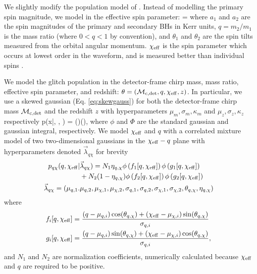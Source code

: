 \begin{refsection}
We slightly modify the population model of \cite{2022CQGra..39q5004A}. Instead of modelling the primary spin magnitude, we model in the effective spin parameter:
\beq
\chieff = 
\label{eq:chieff}
\eeq
where $a_1$ and $a_2$ are the spin magnitudes of the primary and secondary BHs in Kerr units, $q = m_2/m_1$ is the mass ratio (where $0<q<1$ by convention), and $\theta_1$ and $\theta_2$ are the spin tilts measured from the orbital angular momentum. $\chi_{\rm eff}$ is the spin parameter which occurs at lowest order in the waveform, and is measured better than individual spins \citep{2008PhRvD..78d4021R,2016PhRvD..93h4042P,2017PhRvD..95f4053V, 2018PhRvD..98h3007N}. 

We model the glitch population in the detector-frame chirp mass, mass ratio, effective spin parameter, and redshift: $\theta = (\mathcal{M}_{\rm c,det}, q, \chi_{\rm eff}, z)$. In particular, we use a skewed gaussian (Eq. \ref{eq:skewgauss}) for both the detector-frame chirp mass $\mathcal{M}_{\rm c,det}$ and the redshift $z$ with hyperparameters $\mu_m, \sigma_m, \kappa_m$ and $\mu_z, \sigma_z, \kappa_z$ respectively
\beq
p(x|\mu, \sigma, \kappa) = \phi\left(\right)\Phi\left(\kappa{}\right),
\label{eq:skewgauss}
\eeq
where $\phi$ and $\Phi$ are the standard gaussian and gaussian integral, respectively.
We model $\chi_{\rm eff}$ and $q$ with a correlated mixture model of two two-dimensional gaussians in the $\chi_{\rm eff}-q$ plane with hyperparameters denoted $\vec{\lambda}_{q\chi}$ for brevity
\begin{align}
p_{q\chi}(q,\chi_{\rm eff} | &\vec{\lambda}_{q\chi}) = N_1 \eta_{q,\chi}\phi\left(f_1[q,\chi_{\rm eff}]\right)\phi\left(g_1[q,\chi_{\rm eff}]\right) \nonumber \\
&+ N_2 (1-\eta_{q,\chi})\phi\left(f_2[q,\chi_{\rm eff}]\right)\phi\left(g_2[q,\chi_{\rm eff}]\right) \\ 
\vec{\lambda}_{q\chi} = (\mu_{q,1}.&\mu_{q,2},\mu_{\chi,1},\mu_{\chi,2},\sigma_{q,1},\sigma_{q,2},\sigma_{\chi,1},\sigma_{\chi,2},\theta_{q,\chi},\eta_{q,\chi}) \nonumber
\label{eq:chieffq}
\end{align}
where
\begin{align}
f_i[q,\chi_{\rm eff}] &= \frac{(q-\mu_{q,i})\cos(\theta_{q,\chi}) + (\chi_{\rm eff} - \mu_{\chi,i})\sin(\theta_{q,\chi})}{\sigma_{q,i}} \\ 
g_i[q,\chi_{\rm eff}] &= \frac{(q-\mu_{q,i})\sin(\theta_{q,\chi}) + (\chi_{\rm eff} - \mu_{\chi,i})\cos(\theta_{q,\chi})}{\sigma_{q,i}},
\end{align}
and $N_1$ and $N_2$ are normalization coefficients, numerically calculated because $\chi_{\rm eff}$ and $q$ are required to be positive.

\end{refsection}
